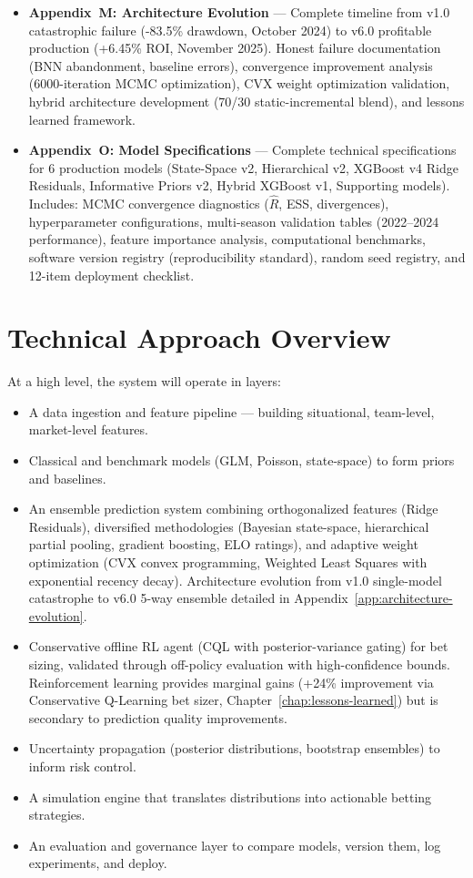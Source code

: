 \begin{itemize}
  \item \textbf{Appendix~M: Architecture Evolution} — Complete timeline from v1.0 catastrophic failure (-83.5\% drawdown, October 2024) to v6.0 profitable production (+6.45\% ROI, November 2025). Honest failure documentation (BNN abandonment, baseline errors), convergence improvement analysis (6000-iteration MCMC optimization), CVX weight optimization validation, hybrid architecture development (70/30 static-incremental blend), and lessons learned framework.
  \item \textbf{Appendix~O: Model Specifications} — Complete technical specifications for 6 production models (State-Space v2, Hierarchical v2, XGBoost v4 Ridge Residuals, Informative Priors v2, Hybrid XGBoost v1, Supporting models). Includes: MCMC convergence diagnostics ($\hat{R}$, ESS, divergences), hyperparameter configurations, multi-season validation tables (2022--2024 performance), feature importance analysis, computational benchmarks, software version registry (reproducibility standard), random seed registry, and 12-item deployment checklist.
\end{itemize}

\section{Technical Approach Overview}

At a high level, the system will operate in layers:

\begin{itemize}
  \item A data ingestion and feature pipeline — building situational, team-level, market-level features.
  \item Classical and benchmark models (GLM, Poisson, state-space) to form priors and baselines.
  \item An ensemble prediction system combining orthogonalized features (Ridge Residuals), diversified methodologies (Bayesian state-space, hierarchical partial pooling, gradient boosting, ELO ratings), and adaptive weight optimization (CVX convex programming, Weighted Least Squares with exponential recency decay). Architecture evolution from v1.0 single-model catastrophe to v6.0 5-way ensemble detailed in Appendix~\ref{app:architecture-evolution}.
  \item Conservative offline RL agent (CQL with posterior-variance gating) for bet sizing, validated through off-policy evaluation with high-confidence bounds. Reinforcement learning provides marginal gains (+24\% improvement via Conservative Q-Learning bet sizer, Chapter~\ref{chap:lessons-learned}) but is secondary to prediction quality improvements.
  \item Uncertainty propagation (posterior distributions, bootstrap ensembles) to inform risk control.
  \item A simulation engine that translates distributions into actionable betting strategies.
  \item An evaluation and governance layer to compare models, version them, log experiments, and deploy.
\end{itemize}



